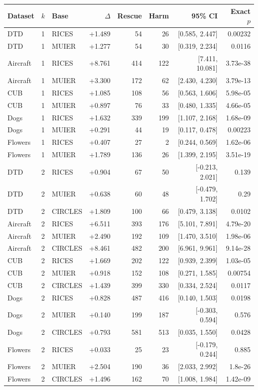 \begin{tabular}{lllrrrrr}
\toprule
Dataset & $k$ & Base & $\Delta$ & Rescue & Harm & 95\% CI & Exact $p$ \\
\midrule
DTD & 1 & RICES & +1.489 & 54 & 26 & [0.585, 2.447] & 0.00232 \\
DTD & 1 & MUIER & +1.277 & 54 & 30 & [0.319, 2.234] & 0.0116 \\
Aircraft & 1 & RICES & +8.761 & 414 & 122 & [7.411, 10.081] & 3.73e-38 \\
Aircraft & 1 & MUIER & +3.300 & 172 & 62 & [2.430, 4.230] & 3.79e-13 \\
CUB & 1 & RICES & +1.085 & 108 & 56 & [0.563, 1.606] & 5.98e-05 \\
CUB & 1 & MUIER & +0.897 & 76 & 33 & [0.480, 1.335] & 4.66e-05 \\
Dogs & 1 & RICES & +1.632 & 339 & 199 & [1.107, 2.168] & 1.68e-09 \\
Dogs & 1 & MUIER & +0.291 & 44 & 19 & [0.117, 0.478] & 0.00223 \\
Flowers & 1 & RICES & +0.407 & 27 & 2 & [0.244, 0.569] & 1.62e-06 \\
Flowers & 1 & MUIER & +1.789 & 136 & 26 & [1.399, 2.195] & 3.51e-19 \\
DTD & 2 & RICES & +0.904 & 67 & 50 & [-0.213, 2.021] & 0.139 \\
DTD & 2 & MUIER & +0.638 & 60 & 48 & [-0.479, 1.702] & 0.29 \\
DTD & 2 & CIRCLES & +1.809 & 100 & 66 & [0.479, 3.138] & 0.0102 \\
Aircraft & 2 & RICES & +6.511 & 393 & 176 & [5.101, 7.891] & 4.79e-20 \\
Aircraft & 2 & MUIER & +2.490 & 192 & 109 & [1.470, 3.510] & 1.98e-06 \\
Aircraft & 2 & CIRCLES & +8.461 & 482 & 200 & [6.961, 9.961] & 9.14e-28 \\
CUB & 2 & RICES & +1.669 & 202 & 122 & [0.939, 2.399] & 1.03e-05 \\
CUB & 2 & MUIER & +0.918 & 152 & 108 & [0.271, 1.585] & 0.00754 \\
CUB & 2 & CIRCLES & +1.439 & 399 & 330 & [0.334, 2.524] & 0.0117 \\
Dogs & 2 & RICES & +0.828 & 487 & 416 & [0.140, 1.503] & 0.0198 \\
Dogs & 2 & MUIER & +0.140 & 199 & 187 & [-0.303, 0.594] & 0.576 \\
Dogs & 2 & CIRCLES & +0.793 & 581 & 513 & [0.035, 1.550] & 0.0428 \\
Flowers & 2 & RICES & +0.033 & 25 & 23 & [-0.179, 0.244] & 0.885 \\
Flowers & 2 & MUIER & +2.504 & 190 & 36 & [2.033, 2.992] & 1.8e-26 \\
Flowers & 2 & CIRCLES & +1.496 & 162 & 70 & [1.008, 1.984] & 1.42e-09 \\
\bottomrule
\end{tabular}
